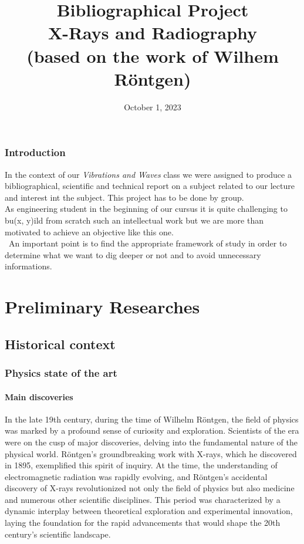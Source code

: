 \documentclass[a4paper,12pt]{report}
\title{Bibliographical Project \\ [1ex]\large X-Rays and Radiography \\ (based on the work of Wilhem Röntgen)  }
\author{    }
\date{October 1, 2023}
\begin{document}
\maketitle 
\tableofcontents
\newpage
\section*{Introduction}
In the context of our \textit{Vibrations and Waves} class we were assigned to produce a bibliographical, scientific and technical report on a subject related to our lecture and interest int the subject. This project has to be done by group. \\

As engineering student in the beginning of our cursus it is quite challenging to bu(x, y)ild from scratch such an intellectual work but we are more than motivated to achieve an objective like this one. \\
\
An important point is to find the appropriate framework of study in order to determine what we want to dig deeper or not and to avoid unnecessary informations.
\addcontentsline{toc}{part}{Introduction}
\part{Preliminary Researches}
\chapter{Historical context}
\section{Physics state of the art}
\subsection{Main discoveries}

In the late 19th century, during the time of Wilhelm Röntgen, the field of physics was marked by a profound sense of curiosity and exploration. Scientists of the era were on the cusp of major discoveries, delving into the fundamental nature of the physical world. Röntgen's groundbreaking work with X-rays, which he discovered in 1895, exemplified this spirit of inquiry. At the time, the understanding of electromagnetic radiation was rapidly evolving, and Röntgen's accidental discovery of X-rays revolutionized not only the field of physics but also medicine and numerous other scientific disciplines. This period was characterized by a dynamic interplay between theoretical exploration and experimental innovation, laying the foundation for the rapid advancements that would shape the 20th century's scientific landscape.
\end{document}
